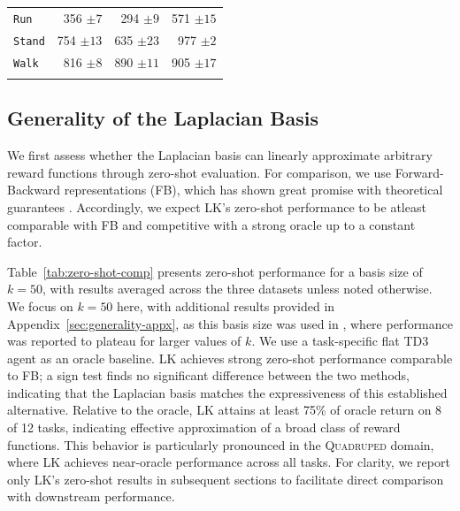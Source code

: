 \documentclass{article}
\theoremstyle{plain}
\theoremstyle{definition}
\theoremstyle{remark}
\begin{document}
\begin{table}[t]
\begin{tabular}{lrrr}
\hspace{.5em} \texttt{Run} & 356 ${\scriptstyle \pm 7}$ & 294 ${\scriptstyle \pm 9}$ & 571 ${\scriptstyle \pm 15}$ \\
\hspace{.5em} \texttt{Stand} & 754 ${\scriptstyle \pm 13}$ & 635 ${\scriptstyle \pm 23}$ & 977 ${\scriptstyle \pm 2}$ \\
\hspace{.5em} \texttt{Walk} & 816 ${\scriptstyle \pm 8}$ & 890 ${\scriptstyle \pm 11}$ & 905 ${\scriptstyle \pm 17}$ \\
\addlinespace

\bottomrule
\end{tabular}
\vspace{-5pt}
\end{table}


\subsection{Generality of the Laplacian Basis}

We first assess whether the Laplacian basis can linearly approximate arbitrary reward functions through zero-shot evaluation. For comparison, we use Forward-Backward representations (FB), which has shown great promise \cite{touati2022does, tirinzonizero} with theoretical guarantees \cite{blier2021learning}. Accordingly, we expect LK's zero-shot performance to be atleast comparable with FB and competitive with a strong oracle up to a constant factor.

Table~\ref{tab:zero-shot-comp} presents zero-shot performance for a basis size of $k=50$, with results averaged across the three datasets unless noted otherwise. We focus on $k=50$ here, with additional results provided in Appendix~\ref{sec:generality-appx}, as this basis size was used in \citet{touati2022does}, where performance was reported to plateau for larger values of $k$. We use a task-specific flat TD3 agent as an oracle baseline. 
LK achieves strong zero-shot performance comparable to FB; a sign test finds no significant difference between the two methods, indicating that the Laplacian basis matches the expressiveness of this established alternative.
Relative to the oracle, LK attains at least 75\% of oracle return on 8 of 12 tasks, indicating effective approximation of a broad class of reward functions. This behavior is particularly pronounced in the \textsc{Quadruped} domain, where LK achieves near-oracle performance across all tasks. For clarity, we report only LK's zero-shot results in subsequent sections to facilitate direct comparison with downstream performance. 
\end{document}
